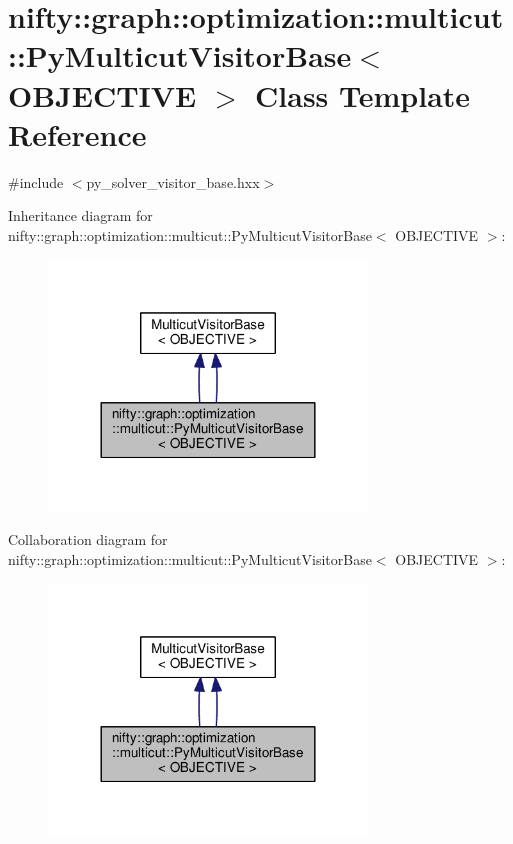 \hypertarget{classnifty_1_1graph_1_1optimization_1_1multicut_1_1PyMulticutVisitorBase}{}\section{nifty\+:\+:graph\+:\+:optimization\+:\+:multicut\+:\+:Py\+Multicut\+Visitor\+Base$<$ O\+B\+J\+E\+C\+T\+I\+V\+E $>$ Class Template Reference}
\label{classnifty_1_1graph_1_1optimization_1_1multicut_1_1PyMulticutVisitorBase}


{\ttfamily \#include $<$py\+\_\+solver\+\_\+visitor\+\_\+base.\+hxx$>$}



Inheritance diagram for nifty\+:\+:graph\+:\+:optimization\+:\+:multicut\+:\+:Py\+Multicut\+Visitor\+Base$<$ O\+B\+J\+E\+C\+T\+I\+V\+E $>$\+:\nopagebreak
\begin{figure}[H]
\begin{center}
\leavevmode
\includegraphics[width=240pt]{classnifty_1_1graph_1_1optimization_1_1multicut_1_1PyMulticutVisitorBase__inherit__graph}
\end{center}
\end{figure}


Collaboration diagram for nifty\+:\+:graph\+:\+:optimization\+:\+:multicut\+:\+:Py\+Multicut\+Visitor\+Base$<$ O\+B\+J\+E\+C\+T\+I\+V\+E $>$\+:\nopagebreak
\begin{figure}[H]
\begin{center}
\leavevmode
\includegraphics[width=240pt]{classnifty_1_1graph_1_1optimization_1_1multicut_1_1PyMulticutVisitorBase__coll__graph}
\end{center}
\end{figure}
